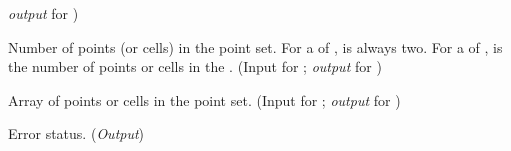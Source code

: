 \begin{Ventryi}{}
      \textcolor{output}{\textit{output}} for )
\item [\fort{npnts}]
      Number of points (or cells) in the point set.
      For a  of , 
      is always two.
      For a  of ,  is
      the number of points or cells in the .
      (\textcolor{input}{Input} for ;
      \textcolor{output}{\textit{output}} for )
\item [\fort{pnts}]
      Array of points or cells in the point set.
      (\textcolor{input}{Input} for ;
      \textcolor{output}{\textit{output}} for )
\item [\fort{ier}]
      Error status.
      (\textcolor{output}{\textit{Output}})
\end{Ventryi}
